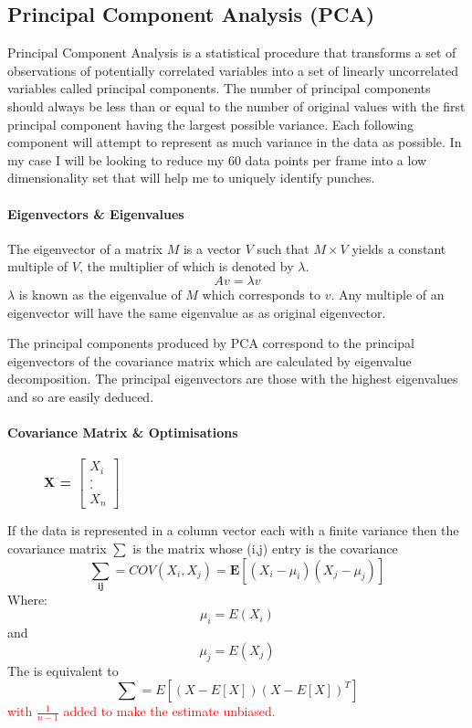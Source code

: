 \subsection{Principal Component Analysis (PCA)}
\label{subsec:subsec01}
Principal Component Analysis is a statistical procedure that transforms a set of observations of potentially correlated variables into a set of linearly uncorrelated variables called principal components. The number of principal components should always be less than or equal to the number of original values with the first principal component having the largest possible variance. Each following component will attempt to represent as much variance in the data as possible. In my case I will be looking to reduce my 60 data points per frame into a low dimensionality set that will help me to uniquely identify punches.

\paragraph{Eigenvectors \& Eigenvalues}
The eigenvector of a matrix $M$ is a vector $V$ such that $M\times V$ yields a constant multiple of $V$, the multiplier of which is denoted by $\lambda.$
$$Av = \lambda v$$
$\lambda$ is known as the eigenvalue of $M$ which corresponds to $v$. Any multiple of an eigenvector will have the same eigenvalue as as original eigenvector.

The principal components produced by PCA correspond to the principal eigenvectors of the covariance matrix which are calculated by eigenvalue decomposition. The principal eigenvectors are those with the highest eigenvalues and so are easily deduced. 

\paragraph{Covariance Matrix \& Optimisations }
\begin{figure}
\vspace{-15pt}
\hspace{15pt}
\bf{X = } $\begin{bmatrix} X_i\\.\\.\\X_n \end{bmatrix}$\newline
\end{figure}
If the data is represented in a column vector each with a finite variance then the covariance matrix $\mathbf{\sum}$ is the matrix whose (i,j) entry is the covariance
$$\mathbf{\sum_{ij}} = COV(X_i,X_j) = \mathbf{E}[(X_i - \mu_i )(X_j - \mu_j )]$$
Where:
$$\mu_i = E(X_i)$$ and $$\mu_j = E(X_j)$$
The is equivalent to $$\mathbf{\sum} = E[(X-E[X])(X-E[X])^T]$$ 
\textcolor{red}{with $\frac{1} {n-1}$ added to make the estimate unbiased.}

